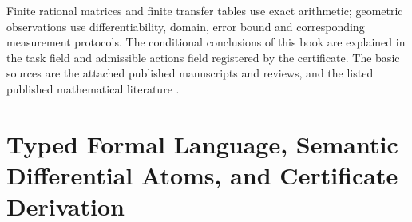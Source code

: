 \documentclass[12pt,a4paper,openany,notitlepage]{report}
\theoremstyle{plain}
\theoremstyle{definition}
\theoremstyle{remark}
\begin{document}
\begin{CJK*}
Finite rational matrices and finite transfer tables use exact arithmetic; geometric observations use differentiability, domain, error bound and corresponding measurement protocols. The conditional conclusions of this book are explained in the task field and admissible actions field registered by the certificate. The basic sources are the attached published manuscripts and reviews, and the listed published mathematical literature \cite{S01,S10,S19,S38,GFrameworkSynthesis,ExtHatcher,ExtWeibel,ExtLadaMarkl,ExtLeeRiemann,ExtKobayashiNomizu,ExtBottTu}. \clearpage {} \chapter{Typed Formal Language, Semantic Differential Atoms, and Certificate Derivation}
\label{exp:ch:logic}


\label{hgov:chapter}


\end{CJK*}
\end{document}
